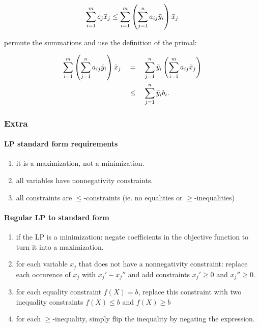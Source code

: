 \begin{enumerate}
    \begin{textred}
    \begin{align}
      \sum_{i = 1}^m c_j  \bar x_j \leq \sum_{i = 1}^m \left(\sum_{j = 1}^n
      a_{ij}\bar y_i\right)  \bar x_j 
    \end{align}
    \end{textred}

    permute the summations and use the definition of the primal:
    \begin{textred}
    \begin{align}
      \sum_{i = 1}^m \left(\sum_{j = 1}^n a_{ij}\bar y_i\right) \bar x_j 
      \quad&=\quad
      \sum_{j = 1}^n \bar y_i \left(\sum_{i = 1}^m a_{ij} \bar x_j\right)\\
      \quad&\leq\quad
      \sum_{j = 1}^n \bar y_i b_i.
    \end{align}
    \end{textred}

\end{enumerate}

\subsubsection{Extra}

\paragraph{LP standard form requirements}

\label{sec:standard_form}
\begin{enumerate}
\item it is a maximization, not a minimization.

\item all variables have nonnegativity constraints.

\item all constraints are $\leq$-constraints (ie. no equalities or
  $\geq$-inequalities)
\end{enumerate}

\paragraph{Regular LP to standard form}
\label{sec:to_standard_form}
\begin{enumerate}
\item if the LP is a minimization: negate coefficients in the objective
  function to turn it into a maximization.

\item for each variable $x_j$ that does not have a nonnegativity constraint:
  replace each occurence of $x_j$ with $x_j' - x_j''$ and add constraints $x_j'
    \geq 0$ and $x_j'' \geq 0$.

\item for each equality constraint $f(X) = b$, replace this constraint with two
  inequality constraints $f(X) \leq b$ and $f(X) \geq b$

\item for each $\geq$-inequality, simply flip the inequality by negating the
  expression.

\end{enumerate}

